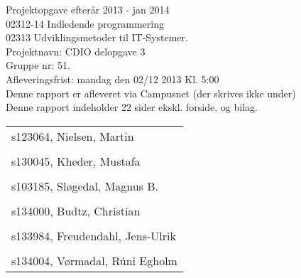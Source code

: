 \thispagestyle{empty}
\begin{titlepage}
\bfseries
\begin{flushleft}
Projektopgave efterår 2013 - jan 2014\\
02312-14 Indledende programmering\\
02313 Udviklingsmetoder til IT-Systemer.\\
Projektnavn: CDIO delopgave 3\\
Gruppe nr: 51.\\
Afleveringsfrist: mandag den 02/12 2013 Kl. 5:00\\
Denne rapport er afleveret via Campusnet (der skrives ikke under)\\
Denne rapport indeholder 22 sider ekskl. forside, og bilag.\\
\end{flushleft}
\vspace{5\baselineskip}
\begin{center}
\begin{tabular}{l}
s123064, Nielsen, Martin\\
\\
s130045, Kheder, Mustafa\\
\\
s103185, Sløgedal, Magnus B.\\
\\
s134000, Budtz, Christian\\
\\
s133984, Freudendahl, Jens-Ulrik\\
\\
s134004, Vørmadal, Rúni Egholm\\
\end{tabular}
\end{center}

\end{titlepage}

\newpage